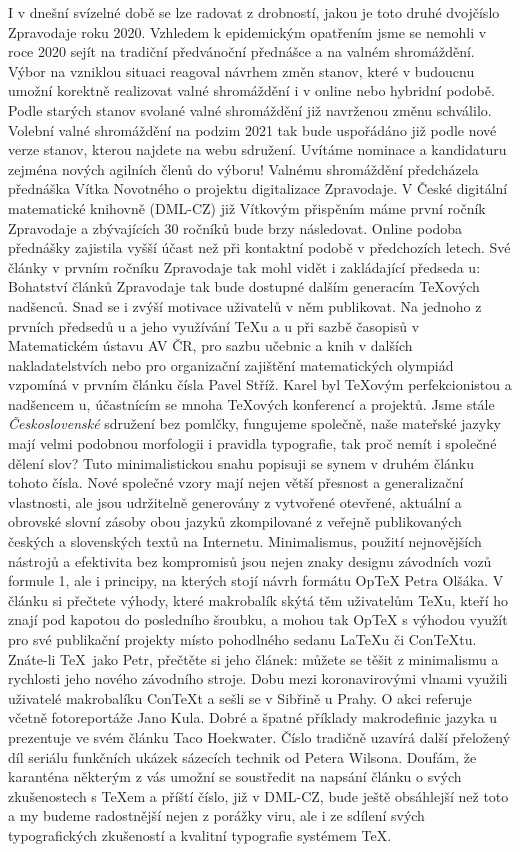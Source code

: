 I v dnešní svízelné době se lze radovat z drobností, jakou je toto druhé dvojčíslo Zpravodaje roku 2020.  Vzhledem k epidemickým opatřením jsme se nemohli v roce 2020 sejít na tradiční předvánoční přednášce a na valném shromáždění.  Výbor na vzniklou situaci reagoval návrhem změn stanov, které v budoucnu umožní korektně realizovat valné shromáždění i v online nebo hybridní podobě.  Podle starých stanov svolané valné shromáždění již navrženou změnu schválilo.  Volební valné shromáždění na podzim 2021 tak bude uspořádáno již podle nové verze stanov, kterou najdete na webu sdružení.  Uvítáme nominace a kandidaturu zejména nových agilních členů do výboru!
Valnému shromáždění předcházela přednáška Vítka Novotného o projektu digitalizace Zpravodaje.  V České digitální matematické knihovně (DML-CZ) již Vítkovým přispěním máme první ročník Zpravodaje a zbývajících 30 ročníků bude brzy následovat.  Online podoba přednášky zajistila vyšší účast než při kontaktní podobě v předchozích letech.  Své články v prvním ročníku Zpravodaje tak mohl vidět i zakládající předseda \CSTUG u:
Bohatství článků Zpravodaje tak bude dostupné dalším generacím \TeX ových nadšenců.  Snad se i zvýší motivace uživatelů v něm publikovat.
Na jednoho z prvních předsedů \CSTUG u a jeho využívání \TeX u a \MF u při sazbě časopisů v Matematickém ústavu AV ČR, pro sazbu učebnic a knih v dalších nakladatelstvích nebo pro organizační zajištění matematických olympiád vzpomíná v prvním článku čísla Pavel Stříž.  Karel byl \TeX ovým perfekcionistou a nadšencem \MF u, účastnícím se mnoha \TeX ových konferencí a projektů.
Jsme stále \emph{Československé} sdružení bez pomlčky, fungujeme společně, naše mateřské jazyky mají velmi podobnou morfologii i pravidla typografie, tak proč nemít i společné dělení slov?  Tuto minimalistickou snahu popisuji se synem v druhém článku tohoto čísla.  Nové společné vzory mají nejen větší přesnost a generalizační vlastnosti, ale jsou udržitelně generovány z vytvořené otevřené, aktuální a obrovské slovní zásoby obou jazyků zkompilované z veřejně publikovaných českých a slovenských textů na Internetu.
Minimalismus, použití nejnovějších nástrojů a efektivita bez kompromisů jsou nejen znaky designu závodních vozů formule 1, ale i principy, na kterých stojí návrh formátu Op\TeX{} Petra Olšáka.  V článku si přečtete výhody, které makrobalík skýtá těm uživatelům \TeX u, kteří ho znají pod kapotou do posledního šroubku, a mohou tak Op\TeX{} s výhodou využít pro své publikační projekty místo pohodlného sedanu \LaTeX u či Con\TeX tu.  Znáte-li \TeX\ jako Petr, přečtěte si jeho článek: můžete se těšit z minimalismu a rychlosti jeho nového závodního stroje.
Dobu mezi koronavirovými vlnami využili uživatelé makrobalíku Con\TeX t a sešli se v Sibřině u Prahy.  O akci referuje včetně fotoreportáže Jano Kula.
Dobré a špatné příklady makrodefinic jazyka \MP u prezentuje ve svém článku Taco Hoekwater.
Číslo tradičně uzavírá další přeložený díl seriálu funkčních ukázek sázecích technik od Petera Wilsona.
Doufám, že karanténa některým z vás umožní se soustředit na napsání článku o svých zkušenostech s \TeX em a příští číslo, již v DML-CZ, bude ještě obsáhlejší než toto a my budeme radostnější nejen z porážky viru, ale i ze sdílení svých typografických zkušeností a kvalitní typografie systémem \TeX.
